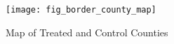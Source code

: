 \begin{figure}[H]
    \centering
    \texttt{[image: fig\_border\_county\_map]}
    \caption{Map of Treated and Control Counties}
    \label{fig:border-county-map}
\end{figure}